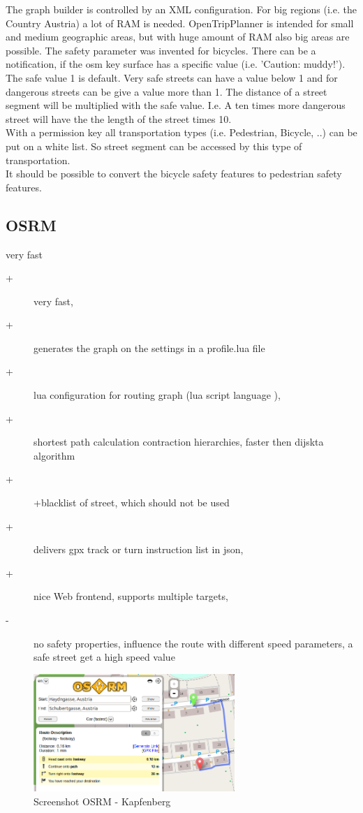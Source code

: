 \documentclass{sig-alternate}
\begin{document}
 The graph builder is controlled by an XML configuration. For big regions (i.e. the Country Austria) a lot of RAM is needed. OpenTripPlanner is intended for small and medium geographic areas, but with huge amount of RAM also big areas are possible. The safety parameter was invented for bicycles. There can be a notification, if the osm key surface  has a specific value (i.e. 'Caution: muddy!'). The safe value 1 is default. Very safe streets can have a value below 1 and for dangerous streets can be give a value more than 1. The distance of a street segment will be multiplied with the safe value. I.e. A ten times more dangerous street will have the the length of the street times 10. \\
 With a permission key all transportation types (i.e. Pedestrian, Bicycle, ..) can be put on a white list. So street segment can be accessed by this type of transportation. \\
 It should be possible to convert the bicycle safety features to pedestrian safety features.
 



\subsection{OSRM}
very fast\cite{luxen-vetter-2011}
\begin{description}
\item[+]very fast, 
\item[+]generates the graph on the settings in a profile.lua file
\item[+]lua configuration for routing graph (lua script language ), 
\item[+]shortest path calculation contraction hierarchies, faster then dijskta algorithm
\item[+]+blacklist of street, which should not be used
\item[+]delivers gpx track or turn instruction list in json,
\item[+]nice Web frontend, supports multiple targets,
\item[-] no safety properties, influence the route with different speed parameters, a safe street get a high speed value
\end{description}

\begin{figure}
\centering
\includegraphics[width=3in]{osrm-ss.png}
\caption{Screenshot OSRM - Kapfenberg}
\end{figure}
\end{document}
